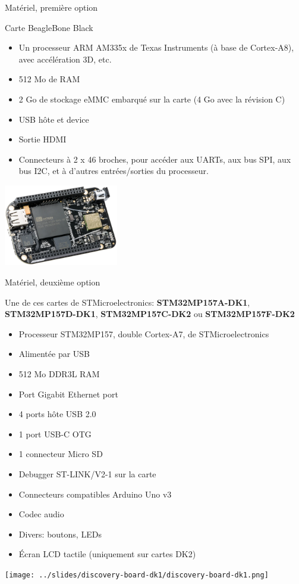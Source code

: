 \documentclass[a4paper,12pt,obeyspaces,spaces,hyphens]{article}
\begin{document}
\feagendatwocolumn
{Matériel, première option}
{
  Carte BeagleBone Black
  \begin{itemize}
  \item Un processeur ARM AM335x de Texas Instruments (à base de
    Cortex-A8), avec accélération 3D, etc.
  \item 512 Mo de RAM
  \item 2 Go de stockage eMMC embarqué sur la carte
	\newline(4 Go avec la révision C)
  \item USB hôte et device
  \item Sortie HDMI
  \item Connecteurs à 2 x 46 broches, pour accéder aux UARTs, aux
        bus SPI, aux bus I2C, et à d'autres entrées/sorties du
        processeur.
  \end{itemize}
}{}
{
  \begin{center}
    \includegraphics[width=5cm]{../slides/beagleboneblack-board/beagleboneblack.png}
  \end{center}
}

\feagendatwocolumn
{Matériel, deuxième option}
{
  Une de ces cartes de STMicroelectronics: {\bf
  STM32MP157A-DK1}, {\bf STM32MP157D-DK1}, {\bf STM32MP157C-DK2} ou
  {\bf STM32MP157F-DK2}
  \begin{itemize}
  \item Processeur STM32MP157, double Cortex-A7, de STMicroelectronics
  \item Alimentée par USB
  \item 512 Mo DDR3L RAM
  \item Port Gigabit Ethernet port
  \item 4 ports hôte USB 2.0
  \item 1 port USB-C OTG
  \item 1 connecteur Micro SD
  \item Debugger ST-LINK/V2-1 sur la carte
  \item Connecteurs compatibles Arduino Uno v3
  \item Codec audio
  \item Divers: boutons, LEDs
  \item Écran LCD tactile (uniquement sur cartes DK2)
  \end{itemize}
}{}
{
  \begin{center}
    \texttt{[image: ../slides/discovery-board-dk1/discovery-board-dk1.png]}
  \end{center}
}
\end{document}
